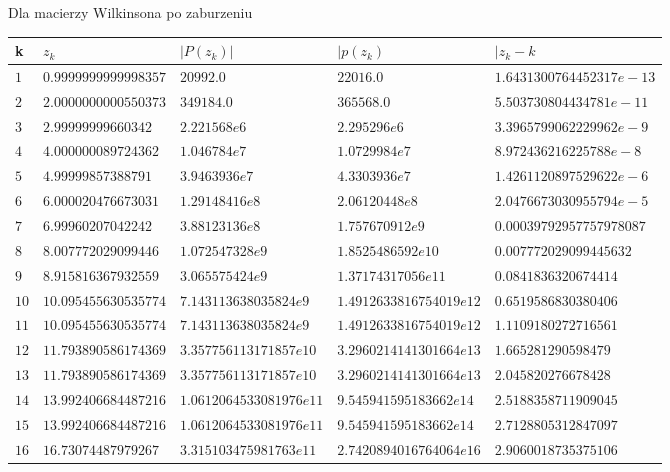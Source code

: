\documentclass{article}
\begin{document}
\newpage
\noindent Dla macierzy Wilkinsona po zaburzeniu
\begin{center}
	\begin{tabular}{|p{}|p{}|p{}|p{}|p{4cm}|} \hline
		\textbf{k} & \textbf{$z_{k}$} & \textbf{$|P(z_{k})|$} & \textbf{$|p(z_{k})$} & \textbf{$|z_{k} - k$}  \\
		\hline 
		$1$ & $0.9999999999998357$ & $20992.0$ & $22016.0$ & $1.6431300764452317e-13$ \\ 
		\hline 
		$2$ & $2.0000000000550373$ & $349184.0$ & $365568.0$ & $5.503730804434781e-11$ \\ 
		\hline 
		$3$ & $2.99999999660342$ & $2.221568e6$ & $2.295296e6$ & $3.3965799062229962e-9$ \\ 
		\hline 
		$4$ & $4.000000089724362$ & $1.046784e7$ & $1.0729984e7$ & $8.972436216225788e-8$ \\ 
		\hline 
		$5$ & $4.99999857388791$ & $3.9463936e7$ & $4.3303936e7$ & $1.4261120897529622e-6$ \\ 
		\hline 
		$6$ & $6.000020476673031$ & $1.29148416e8$ & $2.06120448e8$ & $2.0476673030955794e-5$ \\ 
		\hline 
		$7$ & $6.99960207042242$ & $3.88123136e8$ & $1.757670912e9$ & $0.00039792957757978087$ \\ 
		\hline 
		$8$ & $8.007772029099446$ & $1.072547328e9$ & $1.8525486592e10$ & $0.007772029099445632$ \\ 
		\hline 
		$9$ & $8.915816367932559$ & $3.065575424e9$ & $1.37174317056e11$ & $0.0841836320674414$ \\ 
		\hline 
		$10$ & $10.095455630535774$ & $7.143113638035824e9$ & $1.4912633816754019e12$ & $0.6519586830380406$ \\ 
		\hline 
		$11$ & $10.095455630535774$ & $7.143113638035824e9$ & $1.4912633816754019e12$ & $1.1109180272716561$ \\ 
		\hline 
		$12$ & $11.793890586174369$ & $3.357756113171857e10$ & $3.2960214141301664e13$ & $1.665281290598479$ \\ 
		\hline 
		$13$ & $11.793890586174369$ & $3.357756113171857e10$ & $3.2960214141301664e13$ & $2.045820276678428$ \\ 
		\hline 
		$14$ & $13.992406684487216$ & $1.0612064533081976e11$ & $9.545941595183662e14$ & $2.5188358711909045$ \\ 
		\hline 
		$15$ & $13.992406684487216$ & $1.0612064533081976e11$ & $9.545941595183662e14$ & $2.7128805312847097$ \\ 
		\hline 
		$16$ & $16.73074487979267$ & $3.315103475981763e11$ & $2.7420894016764064e16$ & $2.9060018735375106$ \\ 

\end{tabular}
\end{center}
\end{document}
